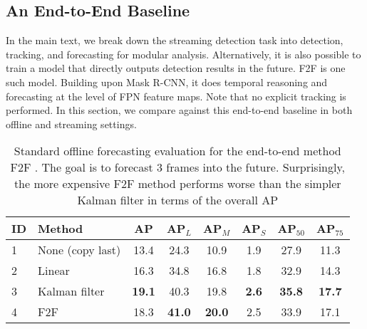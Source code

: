 \subsection{An End-to-End Baseline}
\label{app:e2ebaseline}

In the main text, we break down the streaming detection task into detection, tracking, and forecasting for modular analysis. Alternatively, it is also possible to train a model that directly outputs detection results in the future. F2F \cite{Luc2018PredictingFI} is one such model. Building upon Mask R-CNN, it does temporal reasoning and forecasting at the level of FPN feature maps. Note that no explicit tracking is performed. In this section, we compare against this end-to-end baseline in both offline and streaming settings.

\begin{table*}[]
\small
\centering
\caption{Standard offline forecasting evaluation for the end-to-end method F2F \cite{Luc2018PredictingFI}. The goal is to forecast 3 frames into the future. Surprisingly, the more expensive F2F method performs worse than the simpler Kalman filter in terms of the overall AP}
\label{tab:f2foffline}
\begin{tabular}{llcccccc}
\toprule
ID & Method                                             & AP            & AP$_L$         & AP$_M$        & AP$_S$        & AP$_{50}$        & AP$_{75}$       \\
\midrule
1  & None (copy last) & 13.4          & 24.3          & 10.9          & 1.9          & 27.9          & 11.3          \\
2  & Linear           & 16.3          & 34.8          & 16.8          & 1.8          & 32.9          & 14.3          \\
3  & Kalman filter    & \textbf{19.1} & 40.3          & 19.8          & \textbf{2.6} & \textbf{35.8}          & \textbf{17.7} \\
4  & F2F              & 18.3          & \textbf{41.0} & \textbf{20.0} & 2.5          & 33.9 & 17.1     \\
\bottomrule
\end{tabular}
\end{table*}


